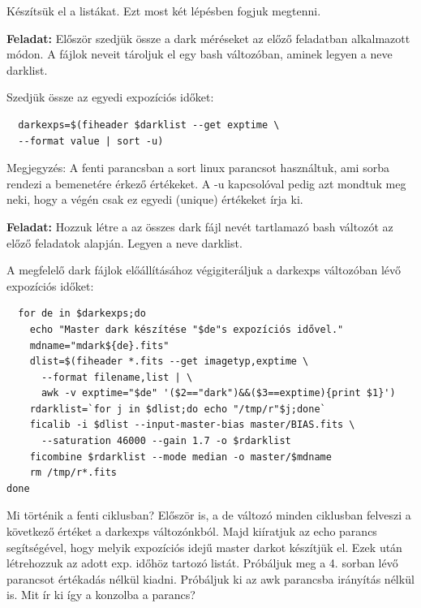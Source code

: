 \documentclass{article}
\begin{document}
Készítsük el a listákat. Ezt most két lépésben fogjuk megtenni.

{\bf Feladat:}
Először szedjük össze a dark méréseket az előző feladatban alkalmazott módon.
A fájlok neveit tároljuk el egy bash változóban, aminek legyen a neve darklist.

Szedjük össze az egyedi expozíciós időket:
\begin{verbatim}
  darkexps=$(fiheader $darklist --get exptime \
  --format value | sort -u)
\end{verbatim}

Megjegyzés: A fenti parancsban a sort linux parancsot használtuk, ami sorba
rendezi a bemenetére érkező értékeket. A -u kapcsolóval pedig azt mondtuk meg
neki, hogy a végén csak ez egyedi (unique) értékeket írja ki.

{\bf Feladat:}
Hozzuk létre a az összes dark fájl nevét tartlamazó bash változót az előző
feladatok alapján. Legyen a neve darklist.

A megfelelő dark fájlok előállításához végigiteráljuk a darkexps változóban lévő
expozíciós időket:

\begin{verbatim}
  for de in $darkexps;do
    echo "Master dark készítése "$de"s expozíciós idővel."
    mdname="mdark${de}.fits"
    dlist=$(fiheader *.fits --get imagetyp,exptime \
      --format filename,list | \
      awk -v exptime="$de" '($2=="dark")&&($3==exptime){print $1}')
    rdarklist=`for j in $dlist;do echo "/tmp/r"$j;done`
    ficalib -i $dlist --input-master-bias master/BIAS.fits \
      --saturation 46000 --gain 1.7 -o $rdarklist
    ficombine $rdarklist --mode median -o master/$mdname
    rm /tmp/r*.fits
done
\end{verbatim}

Mi történik a fenti ciklusban? Először is, a de változó minden ciklusban
felveszi a következő értéket a darkexps változónkból. Majd kiíratjuk az echo
parancs segítségével, hogy melyik expozíciós idejű master darkot készítjük el.
Ezek után létrehozzuk az adott exp. időhöz tartozó listát. Próbáljuk meg a 4.
sorban lévő parancsot értékadás nélkül kiadni. Próbáljuk ki az awk parancsba
irányítás nélkül is. Mit ír ki így a konzolba a parancs?
\end{document}
